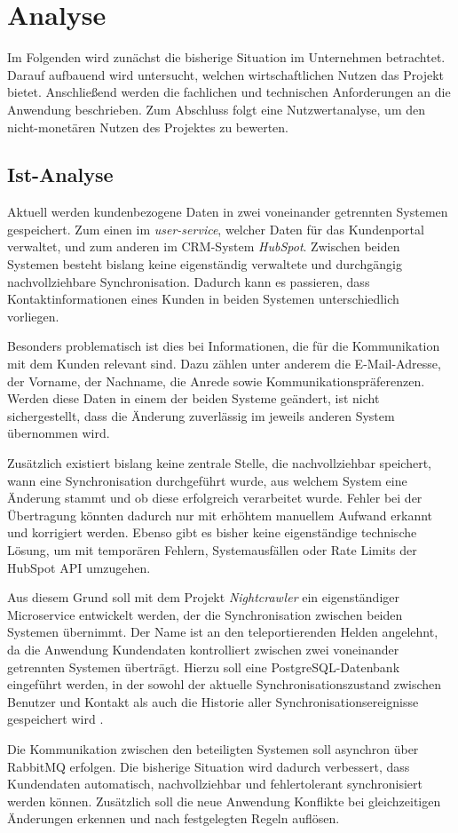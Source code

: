 \section{Analyse} 
\label{sec:Analyse}
Im Folgenden wird zunächst die bisherige Situation im Unternehmen betrachtet.
Darauf aufbauend wird untersucht, welchen wirtschaftlichen Nutzen das Projekt bietet.
Anschließend werden die fachlichen und technischen Anforderungen an die Anwendung beschrieben.
Zum Abschluss folgt eine Nutzwertanalyse, um den nicht-monetären Nutzen des Projektes zu bewerten.

\subsection{Ist-Analyse} 
\label{sec:IstAnalyse}
Aktuell werden kundenbezogene Daten in zwei voneinander getrennten Systemen gespeichert.
Zum einen im \textit{user-service}, welcher Daten für das Kundenportal verwaltet, und zum anderen im CRM-System \textit{HubSpot}.
Zwischen beiden Systemen besteht bislang keine eigenständig verwaltete und durchgängig nachvollziehbare Synchronisation.
Dadurch kann es passieren, dass Kontaktinformationen eines Kunden in beiden Systemen unterschiedlich vorliegen.
\par\smallskip
Besonders problematisch ist dies bei Informationen, die für die Kommunikation mit dem Kunden relevant sind.
Dazu zählen unter anderem die E-Mail-Adresse, der Vorname, der Nachname, die Anrede sowie Kommunikationspräferenzen.
Werden diese Daten in einem der beiden Systeme geändert, ist nicht sichergestellt, dass die Änderung zuverlässig im jeweils anderen System übernommen wird.
\par\smallskip
Zusätzlich existiert bislang keine zentrale Stelle, die nachvollziehbar speichert, wann eine Synchronisation durchgeführt wurde,
aus welchem System eine Änderung stammt und ob diese erfolgreich verarbeitet wurde.
Fehler bei der Übertragung könnten dadurch nur mit erhöhtem manuellem Aufwand erkannt und korrigiert werden.
Ebenso gibt es bisher keine eigenständige technische Lösung, um mit temporären Fehlern, Systemausfällen oder Rate Limits der HubSpot API umzugehen.
\par\smallskip
Aus diesem Grund soll mit dem Projekt \textit{Nightcrawler} ein eigenständiger Microservice entwickelt werden,
der die Synchronisation zwischen beiden Systemen übernimmt.
Der Name ist an den teleportierenden Helden angelehnt, da die Anwendung Kundendaten kontrolliert zwischen zwei voneinander getrennten Systemen überträgt.
Hierzu soll eine PostgreSQL-Datenbank eingeführt werden, in der sowohl der aktuelle Synchronisationszustand
zwischen Benutzer und Kontakt als auch die Historie aller Synchronisationsereignisse gespeichert wird \cite{PostgreSQL16Docs}.
\par\smallskip
Die Kommunikation zwischen den beteiligten Systemen soll asynchron über RabbitMQ erfolgen.
Die bisherige Situation wird dadurch verbessert, dass Kundendaten automatisch, nachvollziehbar und fehlertolerant synchronisiert werden können.
Zusätzlich soll die neue Anwendung Konflikte bei gleichzeitigen Änderungen erkennen und nach festgelegten Regeln auflösen.


